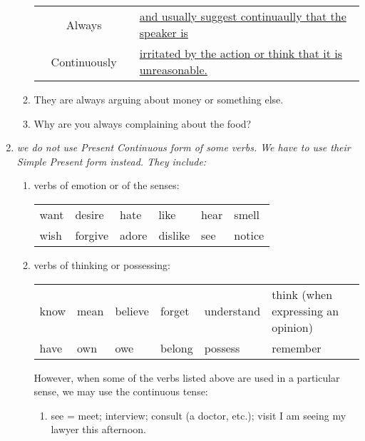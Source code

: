 \begin{enumerate}
\begin{enumerate}
\begin{tabular}{cccl}
                    & Always       & & \underline{and usually suggest continuaully that the speaker is} \\
                    & Continuously & & \underline{irritated by the action or think that it is unreasonable.}
                \end{tabular}
            \item They are always arguing about money or something else.
            \item Why are you always complaining about the food?
        \end{enumerate}
    \item {\it we do not use Present Continuous form of some verbs. We have to
        use their Simple Present form instead. They include:}
        \begin{enumerate}
            \item verbs of emotion or of the senses:
                \newline
                \newline
                \begin{tabular}{llllll}
                    want & desire & hate & like & hear & smell \\
                    wish & forgive & adore & dislike & see & notice
                \end{tabular}
            \item verbs of thinking or possessing:
                \newline
                \newline
                \begin{tabular}{llllll}
                    know & mean & believe & forget & understand & think (when expressing an opinion)\\
                    have & own & owe & belong & possess & remember
                \end{tabular}
                \newline
                However, when some of the verbs listed above are used in a
                particular sense, we may use the continuous tense:
                \newline
                \begin{enumerate}
                    \item see = meet; interview; consult (a doctor, etc.); visit
                        \newline
                        \newline
                        I am seeing my lawyer this afternoon.

\end{enumerate}
\end{enumerate}
\end{enumerate}
